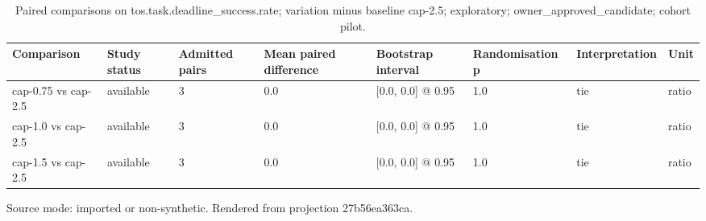 {
\begin{table}[htbp]
\centering
\caption{Paired comparisons on tos.task.deadline\_success.rate; variation minus baseline cap-2.5; exploratory; owner\_approved\_candidate; cohort pilot.}
\label{tab:traffictwin-statistical-study-27b56ea363ca}
\small
\renewcommand{\arraystretch}{1.15}
\begin{tabular}{llllllll}
\hline
Comparison & Study status & Admitted pairs & Mean paired difference & Bootstrap interval & Randomisation p & Interpretation & Unit \\
\hline
cap-0.75 vs cap-2.5 & available & 3 & 0.0 & [0.0, 0.0] @ 0.95 & 1.0 & tie & ratio \\
cap-1.0 vs cap-2.5 & available & 3 & 0.0 & [0.0, 0.0] @ 0.95 & 1.0 & tie & ratio \\
cap-1.5 vs cap-2.5 & available & 3 & 0.0 & [0.0, 0.0] @ 0.95 & 1.0 & tie & ratio \\
\hline
\end{tabular}
\par\footnotesize
Source mode: imported or non-synthetic.
Rendered from projection 27b56ea363ca.
\end{table}
}
